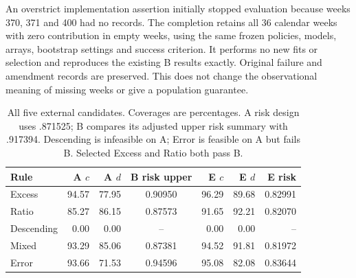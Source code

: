 An overstrict implementation assertion initially stopped evaluation because weeks 370, 371 and 400 had no records. The completion retains all 36 calendar weeks with zero contribution in empty weeks, using the same frozen policies, models, arrays, bootstrap settings and success criterion. It performs no new fits or selection and reproduces the existing B results exactly. Original failure and amendment records are preserved. This does not change the observational meaning of missing weeks or give a population guarantee.

\begin{table}[H]\centering\small
\caption{All five external candidates. Coverages are percentages. A risk design uses .871525; B compares its adjusted upper risk summary with .917394. Descending is infeasible on A; Error is feasible on A but fails B. Selected Excess and Ratio both pass B.}\label{tab:external-v12-all}
\begin{tabular}{lrrcrrr}\toprule
Rule & A $c$ & A $d$ & B risk upper & E $c$ & E $d$ & E risk\\\midrule
Excess & 94.57 & 77.95 & 0.90950 & 96.29 & 89.68 & 0.82991 \\
Ratio & 85.27 & 86.15 & 0.87573 & 91.65 & 92.21 & 0.82070 \\
Descending & 0.00 & 0.00 & -- & 0.00 & 0.00 & -- \\
Mixed & 93.29 & 85.06 & 0.87381 & 94.52 & 91.81 & 0.81972 \\
Error & 93.66 & 71.53 & 0.94596 & 95.08 & 82.08 & 0.83644 \\
\bottomrule\end{tabular}\end{table}
